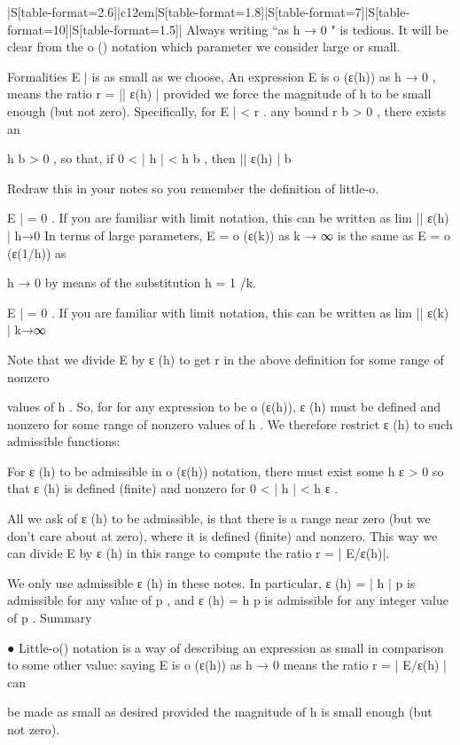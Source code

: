 \begin{table}
\begin{tabular}{|S[table-format=2.6]|c{12em}|S[table-format=1.8]|S[table-format=7]|S[table-format=10]|S[table-format=1.5]|}
Always writing “as  h → 0 "  is tedious.  It will be clear from the  o ()  notation which parameter we  
consider large or small. 
 
Formalities
E | is as small as we choose,  
An expression  E    is  o (ε(h))  as  h → 0 , means the ratio  r = || ε(h)
|
provided we force the magnitude of  h to be small enough (but not zero).  Specifically, for  
E | < r .  
any bound   r b > 0 ,  there exists an 
 
h b > 0 ,  so that, if  0 < | h | < h b ,  then  || ε(h)
| b
 
 
 
 
Redraw this in your notes so you remember the definition of little-o. 
 
 
E | = 0 .  
If you are familiar with limit notation, this can be written as  lim || ε(h)
|
h→0
 In terms of large parameters,  E = o (ε(k))    as  k → ∞   is the same as  E = o (ε(1/h))  as
   
h → 0 by means of the substitution  h = 1 /k.  
 
E | = 0 .  
If you are familiar with limit notation, this can be written as  lim || ε(k)
|
k→∞
 
Note that we divide  E  by 
  ε (h)  to get  r  in the above definition for some range of nonzero
 
 
values of  h .    So, for for any expression to be  o (ε(h)),   ε (h)  must be defined and nonzero  
for some range of nonzero values of  h .    We therefore restrict  ε (h)  to such admissible  
functions:   
 
For  ε (h)  to be admissible in  o (ε(h))  notation, there must exist some  h ε > 0  so  
that  ε (h)  is defined (finite) and nonzero for  0 < | h | < h ε .     
 
 
All we ask of  ε (h)  to be admissible, is that there is a range near zero (but we don’t  
care about at zero), where it is defined (finite) and nonzero.  This way we can 
divide  E    by  ε (h)  in this range to compute the ratio  r = | E/ε(h)|.  
 
 We only use admissible   ε (h)  in these notes.  In particular,  ε (h) = | h | p  is admissible for  
any value of  p ,  and   ε (h) = h p  is admissible for any integer value of  p .  
Summary
 
●
Little-o() notation is a way of describing an expression as small in comparison to 
some other value: saying  E  is 
  o (ε(h))  as  h → 0  means the ratio  r = | E/ε(h) |  can
 
 be made as small as desired provided the magnitude of  h is small enough (but  
not zero). 
 

\end{tabular}
\end{table}
